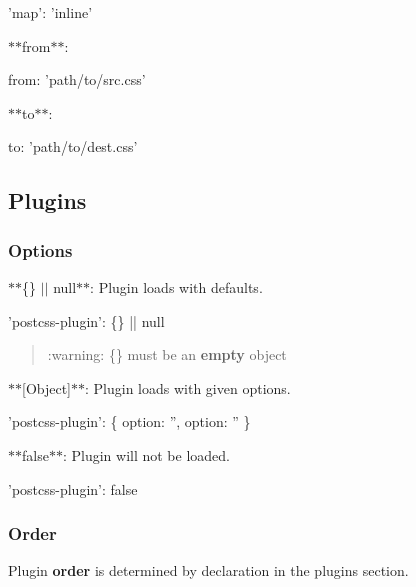 \begin{DoxyCode}
'map': 'inline'
\end{DoxyCode}


$\ast$$\ast${\ttfamily from}$\ast$$\ast$\+:


\begin{DoxyCode}
from: 'path/to/src.css'
\end{DoxyCode}


$\ast$$\ast${\ttfamily to}$\ast$$\ast$\+:


\begin{DoxyCode}
to: 'path/to/dest.css'
\end{DoxyCode}


\subsection*{Plugins}

\subsubsection*{Options}

$\ast$$\ast${\ttfamily \{\} $\vert$$\vert$ null}$\ast$$\ast$\+: Plugin loads with defaults.


\begin{DoxyCode}
'postcss-plugin': \{\} || null
\end{DoxyCode}
 \begin{quote}
\+:warning\+: {\ttfamily \{\}} must be an {\bfseries empty} object \end{quote}


$\ast$$\ast${\ttfamily \mbox{[}Object\mbox{]}}$\ast$$\ast$\+: Plugin loads with given options.


\begin{DoxyCode}
'postcss-plugin': \{ option: '', option: '' \}
\end{DoxyCode}


$\ast$$\ast${\ttfamily false}$\ast$$\ast$\+: Plugin will not be loaded.


\begin{DoxyCode}
'postcss-plugin': false
\end{DoxyCode}


\subsubsection*{Order}

Plugin {\bfseries order} is determined by declaration in the plugins section.


